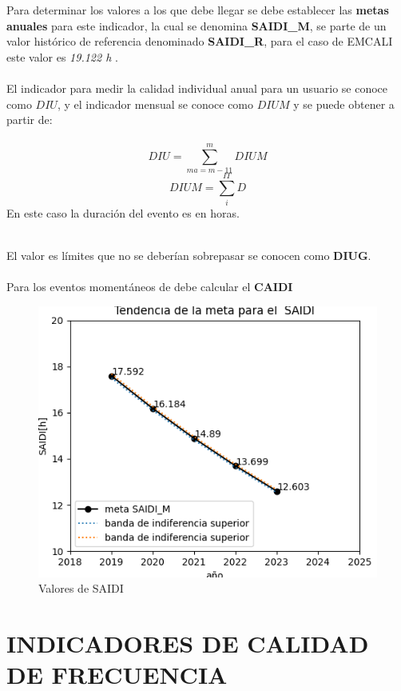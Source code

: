 \documentclass[a5paper]{book}%
\begin{document}
    Para determinar los valores a los que debe llegar se debe establecer las \textbf{metas anuales} para este indicador,  la cual se denomina \textbf{SAIDI\_M},  se parte de un valor  histórico de referencia denominado \textbf{SAIDI\_R}, para el caso de EMCALI  este valor es \textit{19.122 h} \cite{CREG0282020}.\\\\
    
    El indicador para medir la calidad individual anual para un usuario se conoce  como $DIU$, y el indicador mensual se conoce como $DIUM$ y se puede obtener a partir de:\\\\


    \[ DIU = \sum_{ma=m-11}^{m}DIUM  \]
    \[ DIUM = \sum_{i}^{IT}D\]
    En este caso la  duración del evento es en horas.\\\
    
    El valor  es límites que no se deberían sobrepasar se conocen como \textbf{DIUG}.\\\\

    Para los eventos momentáneos de debe calcular el \textbf{CAIDI}

    \begin{figure}[H]
      \centering
      \caption{Valores de SAIDI}
      \label{fig:valoressaidi}
      \includegraphics[width=\linewidth]{meta_saidi}
    \end{figure}
    
    \section{INDICADORES DE CALIDAD DE FRECUENCIA}
    
\end{document}
